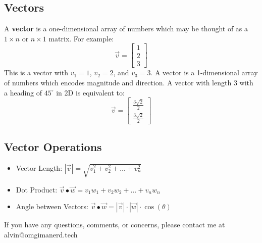 \documentclass[letterpaper, 12pt]{math}
\begin{document}
\subsection*{Vectors}
A \textbf{vector} is a one-dimensional array of numbers which may be thought
of as a \( 1\times n \) or \( n\times1 \) matrix. For example:
\[ \vec{v} = \begin{bmatrix} 1 \\ 2 \\ 3 \end{bmatrix} \]
This is a vector with \( v_{1} = 1 \), \( v_{2} = 2 \), and \( v_{3} = 3 \).
A vector is a 1-dimensional array of numbers which encodes magnitude and
direction. A vector with length 3 with a heading of \( 45^{\circ} \) in 2D
is equivalent to:
\[ \vec{v} =
  \begin{bmatrix}
    \frac{3\sqrt{2}}{2} \\
    \frac{3\sqrt{2}}{2}
  \end{bmatrix}
\]


\subsection*{Vector Operations}
\begin{itemize}
  \item Vector Length: \( |\vec{v}| =
    \sqrt{v_{1}^{2}+v_{2}^{2}+\dots+v_{n}^{2}} \)
  \item Dot Product: \( \vec{v}\bullet\vec{w} = v_{1}w_{1}+v_{2}w_{2}+\dots+
    v_{n}w_{n} \)
  \item Angle between Vectors: \( \vec{v}\bullet\vec{w} =
    |\vec{v}|\cdot|\vec{w}|\cdot\cos(\theta) \)
\end{itemize}

\begin{center}
  If you have any questions, comments, or concerns, please contact me at
  alvin@omgimanerd.tech
\end{center}
\end{document}

